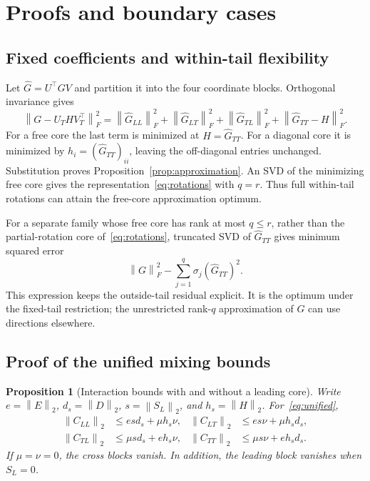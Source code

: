 \documentclass{article}
\newtheorem{proposition}{Proposition}
\newcommand{\op}[1]{\left\|#1\right\|_2}
\newcommand{\fro}[1]{\left\|#1\right\|_F}
\begin{document}
\section{Proofs and boundary cases}
\label{app:proofs}

\subsection{Fixed coefficients and within-tail flexibility}
\label{app:approximation}
Let $\widehat G=U^\top G V$ and partition it into the four coordinate blocks. Orthogonal invariance gives
\begin{equation}
\fro{G-U_T H V_T^\top}^2
=\fro{\widehat G_{LL}}^2+\fro{\widehat G_{LT}}^2
+\fro{\widehat G_{TL}}^2+\fro{\widehat G_{TT}-H}^2.
\end{equation}
For a free core the last term is minimized at $H=\widehat G_{TT}$. For a diagonal core it is minimized by $h_i=(\widehat G_{TT})_{ii}$, leaving the off-diagonal entries unchanged. Substitution proves Proposition~\ref{prop:approximation}. An SVD of the minimizing free core gives the representation~\eqref{eq:rotations} with $q=r$. Thus full within-tail rotations can attain the free-core approximation optimum.

For a separate family whose free core has rank at most $q\le r$, rather than the partial-rotation core of~\eqref{eq:rotations}, truncated SVD of $\widehat G_{TT}$ gives minimum squared error
\begin{equation}
\fro{G}^2-\sum_{j=1}^q\sigma_j(\widehat G_{TT})^2.
\end{equation}
This expression keeps the outside-tail residual explicit. It is the optimum under the fixed-tail restriction; the unrestricted rank-$q$ approximation of $G$ can use directions elsewhere.

\subsection{Proof of the unified mixing bounds}
\label{app:mixingproof}
\begin{proposition}[Interaction bounds with and without a leading core]
\label{prop:mixing}
Write $e=\op{E}$, $d_s=\op{D}$, $s=\op{S_L}$, and $h_s=\op{H}$. For~\eqref{eq:unified},
\begin{align}
\op{C_{LL}}&\le e s d_s+\mu h_s\nu, &
\op{C_{LT}}&\le e s\nu+\mu h_s d_s,\label{eq:blockbound1}\\
\op{C_{TL}}&\le\mu s d_s+e h_s\nu, &
\op{C_{TT}}&\le\mu s\nu+e h_s d_s.\label{eq:blockbound2}
\end{align}
If $\mu=\nu=0$, the cross blocks vanish. In addition, the leading block vanishes when $S_L=0$.
\end{proposition}
\end{document}
